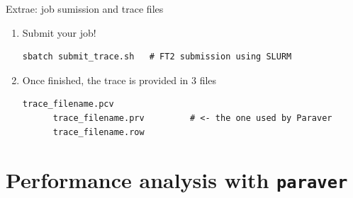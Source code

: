 \documentclass[10pt,xcolor=table]{beamer}
\begin{document}


\begin{frame}[fragile]{Extrae: job sumission and trace files}
  \begin{enumerate}
  \item Submit your job!
    \begin{lstlisting}[style=shell,gobble=5]
      sbatch submit_trace.sh   # FT2 submission using SLURM
    \end{lstlisting}
  \item Once finished, the trace is provided in 3 files
    \begin{lstlisting}[style=shell,gobble=5]
      trace_filename.pcv
      trace_filename.prv         # <- the one used by Paraver
      trace_filename.row
    \end{lstlisting}
  \end{enumerate}
\end{frame}



\section{Performance analysis with {\tt paraver}}
\end{document}
